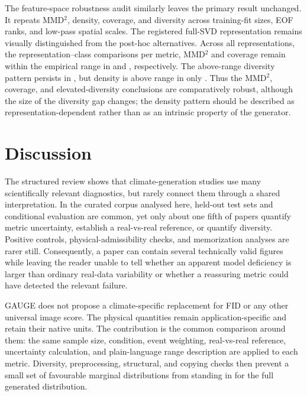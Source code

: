 \documentclass[gmd, manuscript]{copernicus}
\begin{document}
The feature-space robustness audit similarly leaves the primary result unchanged. It
repeats MMD\({}^2\), density, coverage, and diversity across training-fit sizes, EOF
ranks, and low-pass spatial scales. The registered full-SVD representation remains
visually distinguished from the post-hoc alternatives. Across all
\FeatureRepresentationVariants{} representations, the
\FeatureRobustnessComparisons{} representation--class
comparisons per metric, MMD\({}^2\) and coverage remain within the empirical range in
\FeatureMmdWithinCount{} and \FeatureCoverageWithinCount{}, respectively. The
above-range diversity pattern persists in \FeatureDiversityAboveCount{}, but density
is above range in only \FeatureDensityAboveCount{}. Thus the MMD\({}^2\), coverage,
and elevated-diversity conclusions are comparatively robust, although the size of
the diversity gap changes; the density pattern should be described as
representation-dependent rather than as an intrinsic property of the generator.

\section{Discussion}
\label{sec:discussion}

The structured review shows that climate-generation studies use many scientifically
relevant diagnostics, but rarely connect them through a shared interpretation. In the
curated corpus analysed here, held-out test sets and conditional evaluation are common, yet
only about one fifth of papers quantify metric uncertainty, establish a real-vs-real
reference, or quantify diversity. Positive controls, physical-admissibility checks,
and memorization analyses are rarer still. Consequently, a paper can contain several
technically valid figures while leaving the reader unable to tell whether an apparent
model deficiency is larger than ordinary real-data variability or whether a reassuring
metric could have detected the relevant failure.

GAUGE does not propose a climate-specific replacement for FID or any other universal
image score. The physical quantities remain application-specific and retain their
native units. The contribution is the common comparison around them: the same sample
size, condition, event weighting, real-vs-real reference, uncertainty calculation, and
plain-language range description are applied to each metric. Diversity, preprocessing,
structural, and copying checks then prevent a small set of favourable
marginal distributions from standing in for the full generated distribution.
\end{document}
